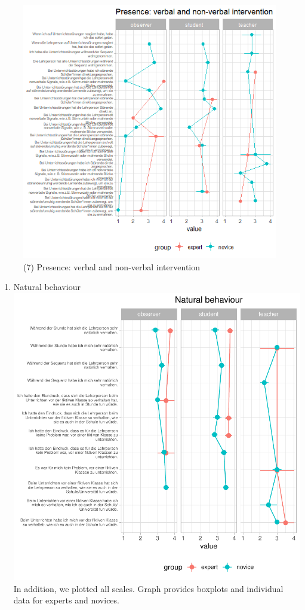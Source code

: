\documentclass[
  english,
  man,floatsintext]{apa6}
\providecommand{\tightlist}{%
  \setlength{\itemsep}{0pt}\setlength{\parskip}{0pt}}
\begin{document}
\begin{figure}

{\centering \includegraphics{./pictures/presenceverbalnonverbalintervention} 

}

\caption{(7) Presence: verbal and non-verbal intervention}\label{fig:presenceverbalnonverbalintervention}
\end{figure}
\newpage

\begin{enumerate}
\def\labelenumi{(\arabic{enumi})}
\setcounter{enumi}{7}
\tightlist
\item
  Natural behaviour
  \includegraphics{paper_1_supplement_files/figure-latex/Natural behaviour line plots-1.pdf}
  \newpage
  In addition, we plotted all scales. Graph provides boxplots and individual data for experts and novices.
\end{enumerate}
\end{document}
